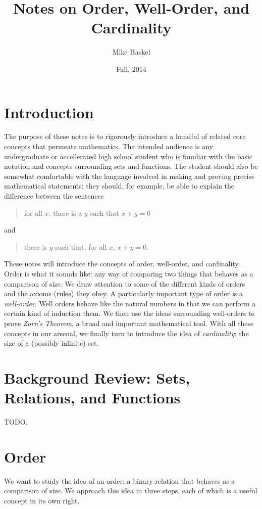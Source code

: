 \documentclass[letterpaper]{article}
\title{Notes on Order, Well-Order, and Cardinality}
\author{Mike Haskel}
\date{Fall, 2014}
\theoremstyle{definition}
\begin{document}
\maketitle

\section{Introduction}
The purpose of these notes is to rigorously introduce a handful of
related core concepts that permeate mathematics.  The intended
audience is any undergraduate or accellerated high school student who
is familiar with the basic notation and concepts surrounding sets and
functions.  The student should also be somewhat comfortable with the
language involved in making and proving precise mathematical
statements; they should, for example, be able to explain the
difference between the sentences
\begin{quote}
  for all $x$, there is a $y$ such that $x+y=0$
\end{quote}
and
\begin{quote}
  there is $y$ such that, for all $x$, $x+y=0$.
\end{quote}

These notes will introduce the concepts of order, well-order, and
cardinality.  Order is what it sounds like: any way of comparing two
things that behaves as a comparison of size.  We draw attention to
some of the different kinds of orders and the axioms (rules) they
obey.  A particularly important type of order is a \emph{well-order}.
Well orders behave like the natural numbers in that we can perform a
certain kind of induction them.  We then use the ideas surrounding
well-orders to prove \emph{Zorn's Theorem}, a broad and important
mathematical tool.  With all these concepts in our arsenal, we finally
turn to introduce the idea of \emph{cardinality}: the size of a
(possibly infinite) set.

\section{Background Review: Sets, Relations, and Functions}
TODO.

\section{Order}
We want to study the idea of an order: a binary relation that behaves
as a comparison of size.  We approach this idea in three steps, each
of which is a useful concept in its own right.
\end{document}
